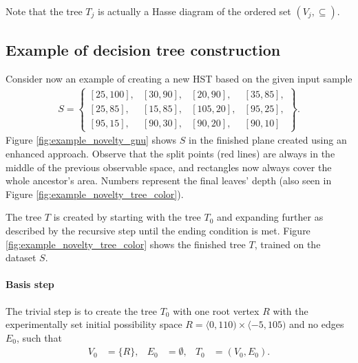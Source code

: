 Note that the tree \(T_{j}\) is actually a Hasse diagram of the ordered set
\((V_j,\subseteq)\).

\subsection{Example of decision tree construction}
\label{example:novelty_tree_create}
Consider now an example of creating a new HST based on the given input sample
\begin{align*}
    S = \left\{\begin{smallmatrix}
    [25,100],& [30,90], &[20,90],&[35,85],\\
    [25,85],&[15,85],&[105,20],&[95,25], \\
    [95,15], &[90,30],&[90,20],&[90,10]
    \end{smallmatrix}\right\}.
\end{align*}
Figure \ref{fig:example_novelty_gnu} shows $S$ in the finished plane created using an enhanced approach. Observe that the split points (red lines) are always in the middle of the previous observable space, and rectangles now always cover the whole ancestor's area. Numbers represent the final leaves' depth (also seen in Figure \ref{fig:example_novelty_tree_color}).

\begin{figure*}[!t]
\centering

\caption{Enhanced approach. Rectangles created by recursive splitting.}
\label{fig:example_novelty_gnu}
\end{figure*}

The tree $T$ is created by starting with the tree $T_0$ and expanding further as described by the recursive step until the ending condition is met.
Figure \ref{fig:example_novelty_tree_color} shows the finished tree $T$, trained on the dataset $S$.

\paragraph{Basis step} 
The trivial step is to create the tree $T_0$ with one root vertex $R$ with the experimentally set initial possibility space  $R= \langle 0,110) \times \langle -5,105)$ and no edges $E_0$, such that
    \begin{align*}
        V_0 &= \{R\},&
        E_0 &= \emptyset,&
        T_0 &= (V_0, E_0).
    \end{align*}

